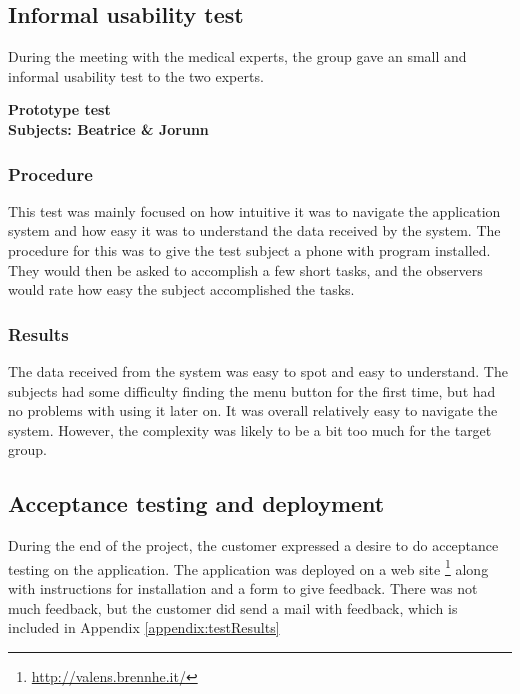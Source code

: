 \subsection{Informal usability test}
During the meeting with the medical experts, the group gave an small and informal usability test to the two experts. 

\textbf{Prototype test}\\
\textbf{Subjects: Beatrice \& Jorunn}
\\

\subsubsection{Procedure}
This test was mainly focused on how intuitive it was to navigate the application system and how easy it was to understand the data received by the system. The procedure for this was to give the test subject a phone with program installed. They would then be asked to accomplish a few short tasks, and the observers would rate how easy the subject accomplished the tasks. 

\subsubsection{Results}
The data received from the system was easy to spot and easy to understand. The subjects had some difficulty finding the menu button for the first time, but had no problems with using it later on. It was overall relatively easy to navigate the system. However, the complexity was likely to be a bit too much for the target group.

\subsection{Acceptance testing and deployment}
During the end of the project, the customer expressed a desire to do acceptance testing on the application. The application was deployed on a web site \footnote{\url{http://valens.brennhe.it/}} along with instructions for installation and a form to give feedback. There was not much feedback, but the customer did send a mail with feedback, which is included in Appendix \ref{appendix:testResults}